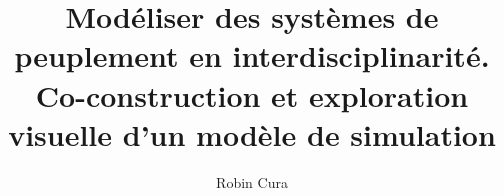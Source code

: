 
\usepackage{titling}
\title{Modéliser des systèmes de peuplement en interdisciplinarité. Co-construction et exploration visuelle d’un modèle de simulation}
\author{Robin Cura}
\date{\vspace{-5ex}}
\makeatletter
\newcommand*{\toccontents}{\@starttoc{toc}}
\makeatother


\newcommand{\simfeodal}{\textsc{SimFeodal}}
\newcommand{\simedb}{\textsc{SimEDB}}


\emergencystretch=1cm


\usepackage[toc,title]{appendix}
\renewcommand{\appendixtocname}{Annexes}
\renewcommand{\appendixpagename}{Annexes} 

\usepackage{pdfpages}
\usepackage{etoolbox}